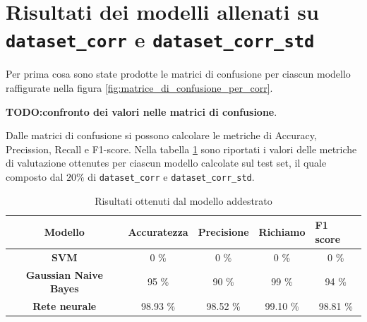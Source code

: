 \section{Risultati dei modelli allenati su \texttt{dataset\_corr} e \texttt{dataset\_corr\_std}} \label{sec:risultati_corr}
Per prima cosa sono state prodotte le matrici di confusione per ciascun modello
raffigurate nella figura \ref{fig:matrice_di_confusione_per_corr}.

\textbf{TODO:confronto dei valori nelle matrici di confusione}.

Dalle matrici di confusione si possono calcolare le metriche di Accuracy, Precission, 
Recall e F1-score. Nella tabella \ref{tab:risultati} sono riportati i valori delle 
metriche di valutazione ottenutes per ciascun modello calcolate sul test set, il quale
composto dal $20\%$ di \texttt{dataset\_corr} e \texttt{dataset\_corr\_std}.
\begin{table}[!ht]
    \centering
    \begin{tabular}{@{}cllll@{}}
        \toprule
        \rowcolor[HTML]{EFEFEF}
        \textbf{Modello}                                      & \textbf{Accuratezza}         & \textbf{Precisione}          & \textbf{Richiamo}            & \textbf{F1 score}            \\ \midrule
        \cellcolor[HTML]{EFEFEF}\textbf{SVM}                  & \multicolumn{1}{c}{0 \%}     & \multicolumn{1}{c}{0 \%}     & \multicolumn{1}{c}{0 \%}     & \multicolumn{1}{c}{0 \%}     \\
        \cellcolor[HTML]{EFEFEF}\textbf{Gaussian Naive Bayes} & \multicolumn{1}{c}{95 \%}    & \multicolumn{1}{c}{90 \%}    & \multicolumn{1}{c}{99 \%}    & \multicolumn{1}{c}{94 \%}    \\
        \cellcolor[HTML]{EFEFEF}\textbf{Rete neurale}         & \multicolumn{1}{c}{98.93 \%} & \multicolumn{1}{c}{98.52 \%} & \multicolumn{1}{c}{99.10 \%} & \multicolumn{1}{c}{98.81 \%} \\ \bottomrule
    \end{tabular}
    \caption{Risultati ottenuti dal modello addestrato}
    \label{tab:risultati}
\end{table}

